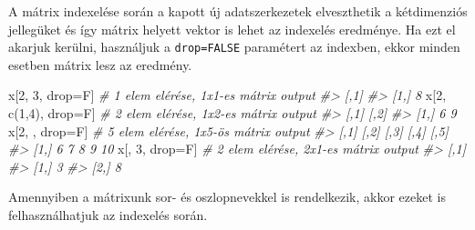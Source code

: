 \documentclass[
]{book}
\newenvironment{Shaded}{\begin{snugshade}}{\end{snugshade}}
\newcommand{\CommentTok}[1]{\textcolor[rgb]{0.56,0.35,0.01}{\textit{#1}}}
\newcommand{\DecValTok}[1]{\textcolor[rgb]{0.00,0.00,0.81}{#1}}
\newcommand{\FunctionTok}[1]{\textcolor[rgb]{0.00,0.00,0.00}{#1}}
\newcommand{\NormalTok}[1]{#1}
\newcommand{\OtherTok}[1]{\textcolor[rgb]{0.56,0.35,0.01}{#1}}
\begin{document}
A mátrix indexelése során a kapott új adatszerkezetek elveszthetik a kétdimenziós jellegüket és így mátrix helyett vektor is lehet az indexelés eredménye. Ha ezt el akarjuk kerülni, használjuk a \texttt{drop=FALSE} paramétert az indexben, ekkor minden esetben mátrix lesz az eredmény.

\begin{Shaded}
\begin{Highlighting}[]
\NormalTok{x[}\DecValTok{2}\NormalTok{, }\DecValTok{3}\NormalTok{, drop}\OtherTok{=}\NormalTok{F]             }\CommentTok{\# 1 elem elérése, 1x1{-}es mátrix output}
\CommentTok{\#\textgreater{}      [,1]}
\CommentTok{\#\textgreater{} [1,]    8}
\NormalTok{x[}\DecValTok{2}\NormalTok{, }\FunctionTok{c}\NormalTok{(}\DecValTok{1}\NormalTok{,}\DecValTok{4}\NormalTok{), drop}\OtherTok{=}\NormalTok{F]        }\CommentTok{\# 2 elem elérése, 1x2{-}es mátrix output}
\CommentTok{\#\textgreater{}      [,1] [,2]}
\CommentTok{\#\textgreater{} [1,]    6    9}
\NormalTok{x[}\DecValTok{2}\NormalTok{, , drop}\OtherTok{=}\NormalTok{F]              }\CommentTok{\# 5 elem elérése, 1x5{-}ös mátrix output}
\CommentTok{\#\textgreater{}      [,1] [,2] [,3] [,4] [,5]}
\CommentTok{\#\textgreater{} [1,]    6    7    8    9   10}
\NormalTok{x[, }\DecValTok{3}\NormalTok{, drop}\OtherTok{=}\NormalTok{F]              }\CommentTok{\# 2 elem elérése, 2x1{-}es mátrix output}
\CommentTok{\#\textgreater{}      [,1]}
\CommentTok{\#\textgreater{} [1,]    3}
\CommentTok{\#\textgreater{} [2,]    8}
\end{Highlighting}
\end{Shaded}

Amennyiben a mátrixunk sor- és oszlopnevekkel is rendelkezik, akkor ezeket is felhasználhatjuk az indexelés során.
\end{document}
